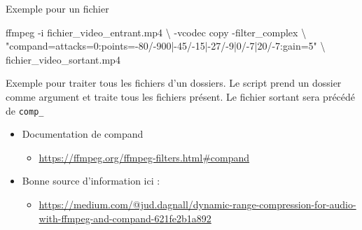 \documentclass[
  french,
]{book}
\newenvironment{Shaded}{\begin{snugshade}}{\end{snugshade}}
\newcommand{\AttributeTok}[1]{\textcolor[rgb]{0.77,0.63,0.00}{#1}}
\newcommand{\BuiltInTok}[1]{#1}
\newcommand{\ControlFlowTok}[1]{\textcolor[rgb]{0.13,0.29,0.53}{\textbf{#1}}}
\newcommand{\DataTypeTok}[1]{\textcolor[rgb]{0.13,0.29,0.53}{#1}}
\newcommand{\ExtensionTok}[1]{#1}
\newcommand{\FunctionTok}[1]{\textcolor[rgb]{0.00,0.00,0.00}{#1}}
\newcommand{\KeywordTok}[1]{\textcolor[rgb]{0.13,0.29,0.53}{\textbf{#1}}}
\newcommand{\NormalTok}[1]{#1}
\newcommand{\OtherTok}[1]{\textcolor[rgb]{0.56,0.35,0.01}{#1}}
\newcommand{\PreprocessorTok}[1]{\textcolor[rgb]{0.56,0.35,0.01}{\textit{#1}}}
\newcommand{\StringTok}[1]{\textcolor[rgb]{0.31,0.60,0.02}{#1}}
\newcommand{\VariableTok}[1]{\textcolor[rgb]{0.00,0.00,0.00}{#1}}
\providecommand{\tightlist}{%
  \setlength{\itemsep}{0pt}\setlength{\parskip}{0pt}}
\begin{document}
Exemple pour un fichier

\begin{Shaded}
\begin{Highlighting}[]
 \ExtensionTok{ffmpeg} \AttributeTok{{-}i}\NormalTok{ fichier\_video\_entrant.mp4 }\DataTypeTok{\textbackslash{}}
 \AttributeTok{{-}vcodec}\NormalTok{ copy  }\AttributeTok{{-}filter\_complex} \DataTypeTok{\textbackslash{}}
 \StringTok{"compand=attacks=0:points={-}80/{-}900|{-}45/{-}15|{-}27/{-}9|0/{-}7|20/{-}7:gain=5"} \DataTypeTok{\textbackslash{}}
\NormalTok{ fichier\_video\_sortant.mp4}
\end{Highlighting}
\end{Shaded}

Exemple pour traiter tous les fichiers d'un dossiers.
Le script prend un dossier comme argument et traite tous les fichiers présent.
Le fichier sortant sera précédé de \texttt{comp\_}

\begin{Shaded}
\end{Shaded}

\begin{itemize}
\tightlist
\item
  Documentation de compand

  \begin{itemize}
  \tightlist
  \item
    \url{https://ffmpeg.org/ffmpeg-filters.html\#compand}
  \end{itemize}
\item
  Bonne source d'information ici :

  \begin{itemize}
  \tightlist
  \item
    \url{https://medium.com/@jud.dagnall/dynamic-range-compression-for-audio-with-ffmpeg-and-compand-621fe2b1a892}
  \end{itemize}
\end{itemize}
\end{document}
